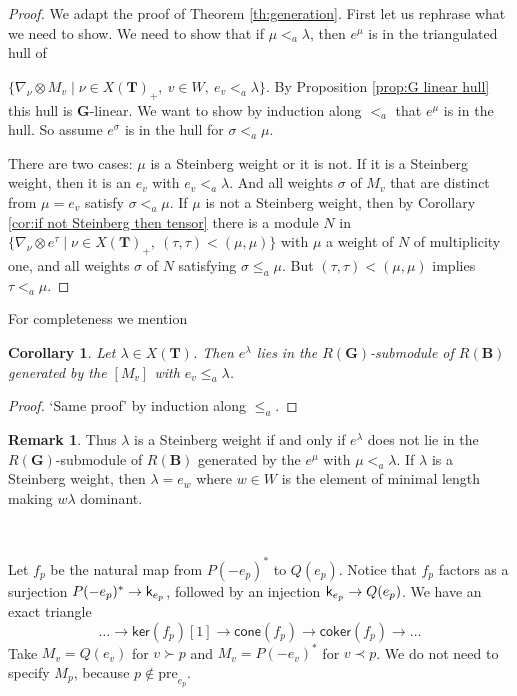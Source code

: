 \documentclass[sn-mathphys-num]{sn-jnl}%
\newcommand{\pre}{{\mathrm{pre}}}
\newcommand{\coker}{{\mathsf{coker}}}
\newcommand{\cone}{{\mathsf{cone}}}
\newcommand{\kernel}{{\mathsf{ker}}}
\newcommand{\sk}{{\sf k}}
\newcommand{\bg}{\mathbf G}
\newcommand{\fb}{\mathbf B}
\newcommand{\bt}{\mathbf T}
\newtheorem{corollary}[theorem]{Corollary}
\theoremstyle{definition}
\newtheorem{remark}[theorem]{Remark}
\begin{document}
\begin{proof}
We adapt the proof of Theorem \ref{th:generation}. First let us rephrase what we need to show. We need to show that if $\mu<_a\lambda$, then $e^\mu$ is in the triangulated hull of 

$\{\nabla_\nu\otimes M_v\mid \nu\in X( \bt)_+,~v\in W, ~e_v<_a\lambda\}.$
By  Proposition \ref{prop:G linear hull} this hull is $\bg$-linear.
We want to show by induction along $<_a$ that $e^\mu$ is in the  hull.
 So assume $e^\sigma$ is in the hull for $\sigma<_a\mu$.

There are two cases: $\mu$ is a Steinberg weight or it is not. If it is a Steinberg weight, then it is an $e_v$ with $e_v<_a\lambda$. And all weights $\sigma$ of $M_v$ that are distinct from $\mu=e_v$ satisfy $\sigma<_a\mu$.
If $\mu$ is not a Steinberg weight, then by Corollary \ref{cor:if not Steinberg then tensor} there is a module $N$  in  $\{\nabla_\nu\otimes e^\tau\mid \nu\in X( \bt)_+,~(\tau,\tau)<(\mu,\mu)\}$ 
with $\mu$ a weight  of $N$ of multiplicity one, and all weights  $\sigma$ of $N$ satisfying 
$\sigma\leq_a\mu$. But $(\tau,\tau)<(\mu,\mu)$ implies $\tau<_a\mu$.
\end{proof}
For completeness we mention
\begin{corollary}\label{cor:ordered_generate}
    Let $\lambda\in X(\bt)$. Then $e^\lambda$ lies in the $R(\bg)$-submodule of $R(\fb)$
generated by the $[M_v]$ with $e_v\leq_a\lambda$.
\end{corollary}
\begin{proof}
    `Same proof' by induction along $\leq_a$.
\end{proof}
\begin{remark}\label{rem:Steinberg from anti}
    Thus $\lambda$ is a Steinberg weight if and only if $e^\lambda$ does not lie in the $R(\bg)$-submodule of $R(\fb)$
generated by the $e^\mu$ with $\mu<_a\lambda$.
 If $\lambda$ is a Steinberg weight, then $\lambda=e_w$ where $w\in W$ is the element of minimal length making $w\lambda$ dominant.
\end{remark}

\

Let $f_p$ be the natural map from $P(-e_p)^*$ to $Q(e_p)$. Notice that $f_p$ factors as a surjection $P(-e_p)^*\to\sk_{e_p}$, followed by an injection $\sk_{e_p}\to Q(e_p)$.
We have an exact triangle 
$$\dots \rightarrow \kernel(f_p)[1]\to \cone(f_p)\to \coker(f_p)\rightarrow \dots$$ 
Take $M_v=Q(e_v)$ for $v\succ p$ and $M_v=P(-e_v)^*$ for $v\prec p$. We do not need to specify $M_p$, because $p\notin \pre_{e_p}$.
\end{document}
